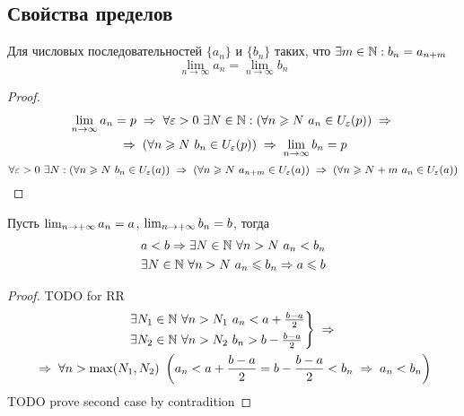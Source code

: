 \subsection{Свойства пределов}
\begin{theorem}
    Для числовых последовательностей $\{ a_n \}$ и $\{ b_n \}$ таких, что $ \exists m \in \mathbb{N} : b_n = a_{n + m}$
    \[ \lim_{n \to \infty} a_n = \lim_{n \to \infty} b_n \]
\end{theorem}
\begin{proof}
    \begin{multline*}
        \lim_{n \to \infty} a_n = p \thus
        \forall \epsilon > 0 \ \exists N \in \N: (\forall n \ge N\ a_n \in U_\epsilon(p)) \thus \\
        \thus (\forall n \ge N\ b_n \in U_\epsilon(p)) \thus
        \lim_{n \to \infty} b_n = p
    \end{multline*}
    \[ \forall \epsilon > 0 \ \exists N : (\forall n \ge N\ b_n \in U_\epsilon(a)) \thus (\forall n \ge N\ a_{n + m} \in U_\epsilon(a)) \thus (\forall n \ge N + m \ a_{n} \in U_\epsilon(a)) \]
\end{proof}

\begin{theorem}
    \label{limit_change_ineq}
    Пусть $\lim_{n\to+\infty} a_n = a$, $\lim_{n\to+\infty} b_n = b$, тогда
    \begin{gather*}
        a < b \Rightarrow \exists N \in \mathbb{N}\ \forall n > N\ a_n < b_n \\
        \exists N \in \mathbb{N}\ \forall n > N\ a_n \leqslant b_n \Rightarrow a \leqslant b
    \end{gather*}
\end{theorem}
\begin{proof}
    TODO for RR
    \begin{multline*}
        \begin{rcases}
            \exists N_1 \in \N\ \forall n > N_1\ a_n < a + \frac{b - a}{2} \\
            \exists N_2 \in \N\ \forall n > N_2\ b_n > b - \frac{b - a}{2}
        \end{rcases} \thus \\
        \thus \forall n > \max(N_1, N_2)\ \left(a_n < a + \frac{b - a}{2} = b - \frac{b - a}{2} < b_n \thus
                a_n < b_n\right)
    \end{multline*}
    TODO prove second case by contradition
\end{proof}

